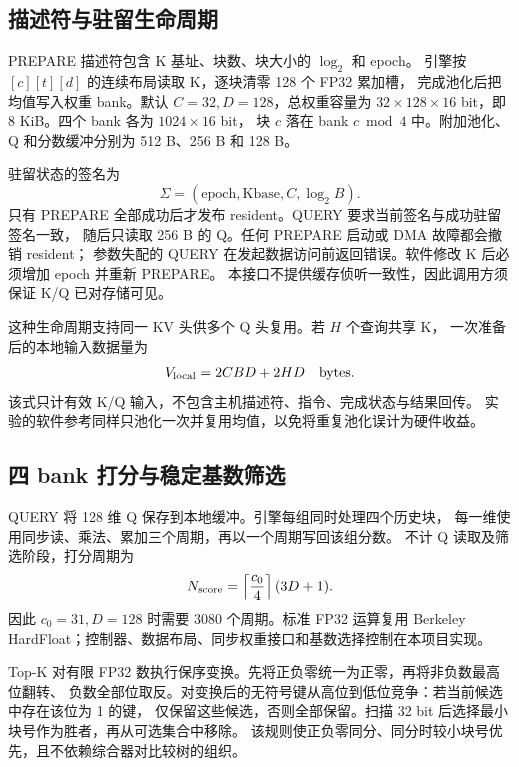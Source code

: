 \documentclass[conference,a4paper]{IEEEtran}
\begin{document}
\subsection{描述符与驻留生命周期}
PREPARE 描述符包含 K 基址、块数、块大小的 $\log_2$ 和 epoch。
引擎按 $[c][t][d]$ 的连续布局读取 K，逐块清零 128 个 FP32 累加槽，
完成池化后把均值写入权重 bank。默认 $C=32,D=128$，总权重容量为
$32\times128\times16$ bit，即 8 KiB。四个 bank 各为 $1024\times16$ bit，
块 $c$ 落在 bank $c\bmod4$ 中。附加池化、Q 和分数缓冲分别为 512 B、256 B 和 128 B。

驻留状态的签名为
\begin{equation}
\Sigma=(\mathrm{epoch},\mathrm{Kbase},C,\log_2 B).
\end{equation}
只有 PREPARE 全部成功后才发布 resident。QUERY 要求当前签名与成功驻留签名一致，
随后只读取 256 B 的 Q。任何 PREPARE 启动或 DMA 故障都会撤销 resident；
参数失配的 QUERY 在发起数据访问前返回错误。软件修改 K 后必须增加 epoch 并重新 PREPARE。
本接口不提供缓存侦听一致性，因此调用方须保证 K/Q 已对存储可见。

这种生命周期支持同一 KV 头供多个 Q 头复用。若 $H$ 个查询共享 K，
一次准备后的本地输入数据量为
\begin{equation}
V_{\rm local}=2CBD+2HD\quad\text{bytes}.\label{eq:traffic}
\end{equation}
该式只计有效 K/Q 输入，不包含主机描述符、指令、完成状态与结果回传。
实验的软件参考同样只池化一次并复用均值，以免将重复池化误计为硬件收益。

\subsection{四 bank 打分与稳定基数筛选}
QUERY 将 128 维 Q 保存到本地缓冲。引擎每组同时处理四个历史块，
每一维使用同步读、乘法、累加三个周期，再以一个周期写回该组分数。
不计 Q 读取及筛选阶段，打分周期为
\begin{equation}
N_{\rm score}=\left\lceil\frac{c_0}{4}\right\rceil(3D+1).
\end{equation}
因此 $c_0=31,D=128$ 时需要 3080 个周期。标准 FP32 运算复用
Berkeley HardFloat\cite{hardfloat}；控制器、数据布局、同步权重接口和基数选择控制在本项目实现。

Top-K 对有限 FP32 数执行保序变换。先将正负零统一为正零，再将非负数最高位翻转、
负数全部位取反。对变换后的无符号键从高位到低位竞争：若当前候选中存在该位为 1 的键，
仅保留这些候选，否则全部保留。扫描 32 bit 后选择最小块号作为胜者，再从可选集合中移除。
该规则使正负零同分、同分时较小块号优先，且不依赖综合器对比较树的组织。
\end{document}
